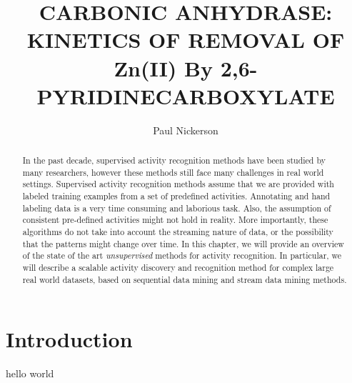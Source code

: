 \documentclass{elsarticle}
\theoremstyle{definition}
\begin{document}
\begin{frontmatter}

\title{CARBONIC ANHYDRASE: KINETICS OF REMOVAL OF Zn(II) By 2,6-PYRIDINECARBOXYLATE}

\author{Paul Nickerson}
\address{Chemistry Department, \\ University of Florida, \\ Gainesville, FL, US}

\begin{abstract}
In the past decade, supervised activity recognition methods have been studied by many researchers, however these methods still face many challenges in real world settings. Supervised activity recognition methods assume that we are provided with labeled training examples from a set of predefined activities. Annotating and hand labeling data is a very time consuming and laborious task. Also, the assumption of consistent pre-defined activities might not hold in reality. More importantly, these algorithms do not take into account the streaming nature of data, or the possibility that the patterns might change over time. In this chapter, we will provide an overview of the state of the art \emph{unsupervised} methods for activity recognition. In particular, we will describe a scalable activity discovery and recognition method for complex large real world datasets, based on sequential data mining and stream data mining methods.
\end{abstract}

\end{frontmatter}
\newpage

\section{Introduction}
hello world
\end{document}
